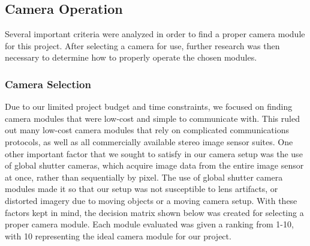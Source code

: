 \subsection{Camera Operation}
Several important criteria were analyzed in order to find a proper camera module for this project. After selecting a  camera for use, further research was then necessary to determine how to properly operate the chosen modules. 
\subsubsection{Camera Selection}  \label{camdecision}
Due to our limited project budget and time constraints, we focused on finding camera modules that were low-cost and simple to communicate with. This ruled out many low-cost camera modules that rely on complicated communications protocols, as well as all commercially available stereo image sensor suites. One other important factor that we sought to satisfy in our camera setup was the use of global shutter cameras, which acquire image data from the entire image sensor at once, rather than sequentially by pixel. The use of global shutter camera modules made it so that our setup was not susceptible to lens artifacts, or distorted imagery due to moving objects or a moving camera setup. With these factors kept in mind, the decision matrix shown below was created for selecting a proper camera module. Each module evaluated was given a ranking from 1-10, with 10 representing the ideal camera module for our project. 
\par
\singlespacing
